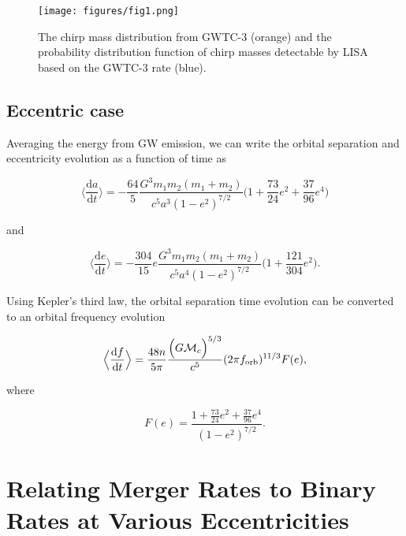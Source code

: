 \documentclass[twocolumn]{aastex631}
\begin{document}
\begin{figure}
	\texttt{[image: figures/fig1.png]}
    \caption{The chirp mass distribution from GWTC-3 (orange) and the probability distribution function of chirp masses detectable by LISA based on the GWTC-3 rate (blue).}
    \label{fig:circ_Mdist}
\end{figure}


\subsection{Eccentric case}
\label{sec:ecc}
 Averaging the energy from GW emission, we can write the orbital separation and eccentricity evolution as a function of time as

\begin{equation}
    \Big\langle \frac{\mathrm{d}a}{\mathrm{d}t} \Big\rangle = - \frac{64}{5} \frac{G^3 m_1 m_2 (m_1 + m_2)}{c^5 a^3 (1 - e^2)^{7/2}} \Big(1 + \frac{73}{24} e^2 + \frac{37}{96} e^4 \Big)
    \label{eq:dadt}
\end{equation}

\noindent and 

\begin{equation}
    \Big\langle\frac{\mathrm{d}e}{\mathrm{d}t}\Big\rangle = -\frac{304}{15} e \frac{G^3 m_1 m_2 (m_1 + m_2)}{c^5 a^4 (1-e^2)^{7/2}} \Big( 1 + \frac{121}{304} e^{2}\Big).
    \label{eq:dedt}
\end{equation}

Using Kepler's third law, the orbital separation time evolution can be converted to an orbital frequency evolution 

\begin{equation}
    \Big\langle\frac{\mathrm{d}f}{\mathrm{d}t}\Big\rangle = \frac{48 n}{5 \pi} \frac{\Big(G \mathcal{M}_c \Big)^{5/3}}{c^5} (2 \pi f_{\rm orb})^{11/3} F(e), 
    \label{eq:fdot}
\end{equation}

\noindent where 

\begin{equation}
    F(e) = \frac{1 + \frac{73}{24} e^2 + \frac{37}{96} e^4}{(1 - e^2)^{7/2}}.
    \label{eq:eccentricity_enhancement_factor}
\end{equation}


\section{Relating Merger Rates to Binary Rates at Various Eccentricities}
\end{document}
